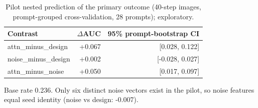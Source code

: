 \begin{table}[t]
\centering\small
\caption{Pilot nested prediction of the primary outcome (40-step images, prompt-grouped cross-validation, 28 prompts); exploratory.}
\label{tab:pilot-nested}
\begin{tabular}{lrr}
\toprule
Contrast & $\Delta$AUC & 95\% prompt-bootstrap CI \\
\midrule
attn\_minus\_design & +0.067 & [0.028, 0.122] \\
noise\_minus\_design & +0.002 & [-0.028, 0.027] \\
attn\_minus\_noise & +0.050 & [0.017, 0.097] \\
\bottomrule
\end{tabular}
\par\smallskip\footnotesize Base rate 0.236. Only six distinct noise vectors exist in the pilot, so noise features equal seed identity (noise vs design: -0.007).
\end{table}
